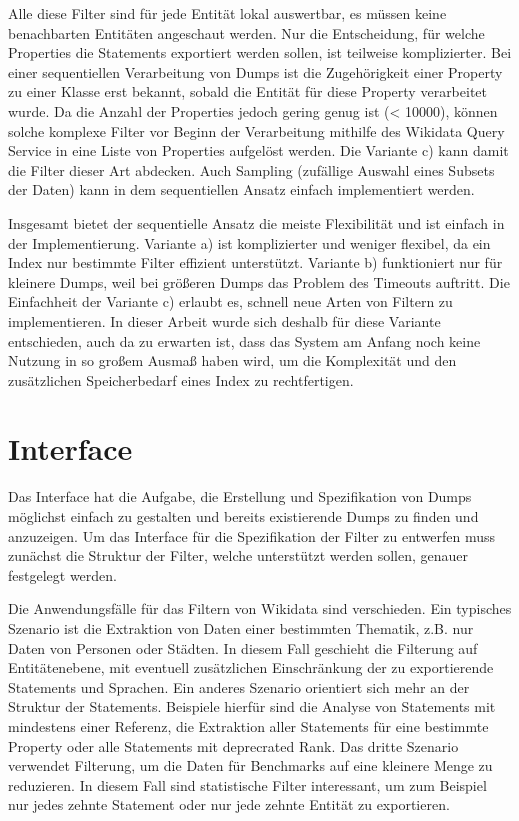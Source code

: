 Alle diese Filter sind für jede Entität lokal auswertbar, es müssen keine benachbarten Entitäten angeschaut werden.
Nur die Entscheidung, für welche Properties die Statements exportiert werden sollen, ist teilweise komplizierter.
Bei einer sequentiellen Verarbeitung von Dumps ist die Zugehörigkeit einer Property zu einer Klasse erst bekannt, sobald die Entität für diese Property verarbeitet wurde.
Da die Anzahl der Properties jedoch gering genug ist (< 10000), können solche komplexe Filter vor Beginn der Verarbeitung mithilfe des Wikidata Query Service in eine Liste von Properties aufgelöst werden.
Die Variante c) kann damit die Filter dieser Art abdecken.
Auch Sampling (zufällige Auswahl eines Subsets der Daten) kann in dem sequentiellen Ansatz einfach implementiert werden.

Insgesamt bietet der sequentielle Ansatz die meiste Flexibilität und ist einfach in der Implementierung.
Variante a) ist komplizierter und weniger flexibel, da ein Index nur bestimmte Filter effizient unterstützt.
Variante b) funktioniert nur für kleinere Dumps, weil bei größeren Dumps das Problem des Timeouts auftritt.
Die Einfachheit der Variante c) erlaubt es, schnell neue Arten von Filtern zu implementieren.
In dieser Arbeit wurde sich deshalb für diese Variante entschieden, auch da zu erwarten ist, dass das System am Anfang noch keine Nutzung in so großem Ausmaß haben wird, um die Komplexität und den zusätzlichen Speicherbedarf eines Index zu rechtfertigen.

\section{Interface}
Das Interface hat die Aufgabe, die Erstellung und Spezifikation von Dumps möglichst einfach zu gestalten und bereits existierende Dumps zu finden und anzuzeigen.
Um das Interface für die Spezifikation der Filter zu entwerfen muss zunächst die Struktur der Filter, welche unterstützt werden sollen, genauer festgelegt werden.

Die Anwendungsfälle für das Filtern von Wikidata sind verschieden.
Ein typisches Szenario ist die Extraktion von Daten einer bestimmten Thematik, z.B. nur Daten von Personen oder Städten.
In diesem Fall geschieht die Filterung auf Entitätenebene, mit eventuell zusätzlichen Einschränkung der zu exportierende Statements und Sprachen.
Ein anderes Szenario orientiert sich mehr an der Struktur der Statements.
Beispiele hierfür sind die Analyse von Statements mit mindestens einer Referenz, die Extraktion aller Statements für eine bestimmte Property oder alle Statements mit deprecrated Rank.
Das dritte Szenario verwendet Filterung, um die Daten für Benchmarks auf eine kleinere Menge zu reduzieren.
In diesem Fall sind statistische Filter interessant, um zum Beispiel nur jedes zehnte Statement oder nur jede zehnte Entität zu exportieren.

